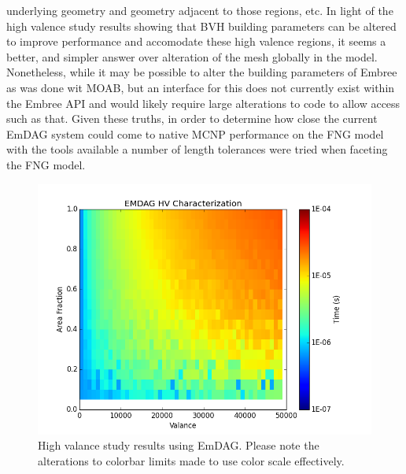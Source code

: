 \documentclass[12pt, a4paper]{article}
\begin{document}
underlying geometry and geometry adjacent to those regions, etc. In light of the high valence study results showing that BVH building parameters can be altered to improve performance and accomodate these high valence regions, it seems a better, and simpler answer over alteration of the mesh globally in the model. Nonetheless, while it may be possible to alter the building parameters of Embree as was done wit MOAB, but an interface for this does not currently exist within the Embree API and would likely require large alterations to code to allow access such as that. Given these truths, in order to determine how close the current EmDAG system could come to native MCNP performance on the FNG model with the tools available a number of length tolerances were tried when faceting the FNG model.  

\begin{figure}[H]
  \begin{center}
    \includegraphics[scale=0.35]{hv_emdag.png}
    \caption{High valance study results using EmDAG. Please note the alterations to colorbar limits made to use color scale effectively.}
    \label{emdaghvstudy}
  \end{center}
\end{figure}
\end{document}
